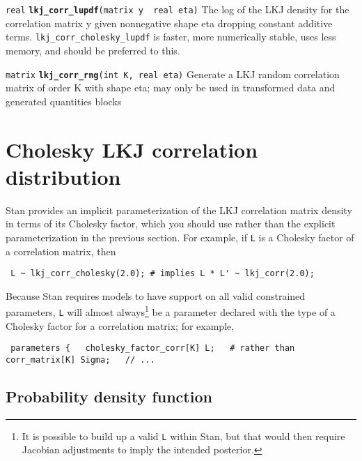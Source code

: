 \documentclass[
  10pt,
]{book}
\begin{document}

\texttt{real} \textbf{\texttt{lkj\_corr\_lupdf}}\texttt{(matrix\ y\ \textbar{}\ real\ eta)}\newline
The log of the LKJ density for the correlation matrix y given
nonnegative shape eta dropping constant additive terms.
\texttt{lkj\_corr\_cholesky\_lupdf} is faster, more numerically stable, uses less memory,
and should be preferred to this.


\texttt{matrix} \textbf{\texttt{lkj\_corr\_rng}}\texttt{(int\ K,\ real\ eta)}\newline
Generate a LKJ random correlation matrix of order K with shape eta;
may only be used in transformed data and generated quantities blocks

\hypertarget{cholesky-lkj-correlation-distribution}{%
\section{Cholesky LKJ correlation distribution}\label{cholesky-lkj-correlation-distribution}}

Stan provides an implicit parameterization of the LKJ correlation
matrix density in terms of its Cholesky factor, which you should use
rather than the explicit parameterization in the previous section. For
example, if \texttt{L} is a Cholesky factor of a correlation matrix, then

\begin{verbatim}
 L ~ lkj_corr_cholesky(2.0); # implies L * L' ~ lkj_corr(2.0);
\end{verbatim}

Because Stan requires models to have support on all valid constrained
parameters, \texttt{L} will almost always\footnote{It is possible to build up a valid \texttt{L} within Stan, but that
  would then require Jacobian adjustments to imply the intended
  posterior.} be a parameter declared
with the type of a Cholesky factor for a correlation matrix; for
example,

\begin{verbatim}
 parameters {   cholesky_factor_corr[K] L;   # rather than corr_matrix[K] Sigma;   // ...
\end{verbatim}

\hypertarget{probability-density-function-33}{%
\subsection{Probability density function}\label{probability-density-function-33}}
\end{document}

